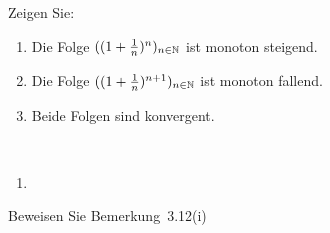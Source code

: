\bigskip

\begin{lsg}  
\end{lsg}

\bigskip


\begin{aufg}[6 Punkte]
Zeigen Sie: 
\begin{enumerate}[label=$\mathrm{(\roman*)}$, ref=$\mathrm{\roman*}$]
\item Die Folge $((1+\frac{1}{n})^n)_{n\in\mathbb{N}}$ ist monoton steigend.
\item Die Folge $((1+\frac{1}{n})^{n+1})_{n\in\mathbb{N}}$ ist monoton fallend.
\item Beide Folgen sind konvergent. 
\end{enumerate}
\end{aufg}
 
\bigskip

\begin{lsg}\mbox{ }
\begin{enumerate}[label=$\mathrm{(\roman*)}$, ref=$\mathrm{\roman*}$]
\item 
\end{enumerate}
\end{lsg}

\bigskip

\begin{aufg}
 Beweisen Sie Bemerkung~3.12(i)
\end{aufg}

\bigskip

\begin{lsg}
\end{lsg}
 
